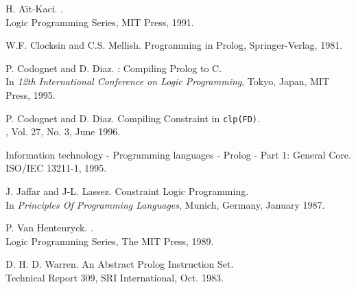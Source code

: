 \newpage


\begin{thebibliography}{99}

 H. A\"{\i}t-Kaci.
. \\
\newblock Logic Programming Series, MIT Press, 1991. \\
\newblock {}

 W.F. Clocksin and C.S. Mellish.
\newblock Programming in Prolog, Springer-Verlag, 1981.

 P. Codognet and D. Diaz.
: Compiling Prolog to C.\\
\newblock In {\em 12th International Conference on Logic Programming},
Tokyo, Japan, MIT Press, 1995. \\
\newblock {}

 P. Codognet and D. Diaz.
\newblock Compiling Constraint in {\tt clp(FD)}. \\
, Vol. 27, No. 3, June 1996. \\
\newblock {}

\newblock Information technology - Programming languages - Prolog - Part 1:
General Core. \\
\newblock ISO/IEC 13211-1, 1995.
\newblock {}

 J. Jaffar and J-L. Lassez.
\newblock Constraint Logic Programming. \\
\newblock In {\em Principles Of Programming Languages},
Munich, Germany, January 1987. 

 P. Van Hentenryck.
. \\
\newblock Logic Programming Series, The MIT Press, 1989.

 D. H. D. Warren.
\newblock An Abstract Prolog Instruction Set. \\
\newblock Technical Report 309, SRI International, Oct. 1983.

\end{thebibliography}

